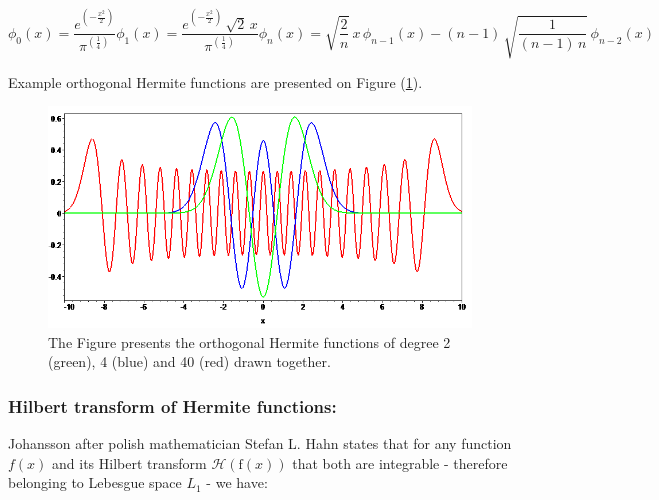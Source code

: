 \documentclass[12pt,twoside,a4paper]{article}
\numberwithin{equation}{subsection}
\numberwithin{figure}{subsection}
\begin{document}
\begin{subequations} \label{eq:hermite_recresult}
  \begin{equation}   \label{eq:hrr_iter}
    \phi_0 (x) = \frac {e^{( - \frac {x ^ 2} {2})}} {\pi ^{(\frac {1}{4})}}
  \end{equation}
  \begin{equation}   \label{eq:hrr_iter_plus1}
    \phi_1 (x) = \frac {e^{( - \frac {x ^ 2} {2})} \, \sqrt{2} \, x} {\pi ^{(\frac {1}{4})}}
  \end{equation}
  \begin{equation}   \label{eq:hrr_weight}
    \phi_n (x) = \sqrt{\frac {2}{n}} \, x \, {\phi_{n - 1}}(x) - (n - 1) \, \sqrt{\frac {1} {(n - 1) \, n}} \, \phi_{n - 2}(x)
  \end{equation}
\end{subequations}

Example orthogonal Hermite functions are presented on Figure (\ref{fig:her_plots}).

\begin{figure}
  \includegraphics[width=150mm]{img/her_plots.png}
  \caption{ The Figure presents the orthogonal Hermite functions of degree 2 (green), 4 (blue) and 40 (red) drawn together. } \label{fig:her_plots}
\end{figure}
 
\subsubsection*{Hilbert transform of Hermite functions:}

Johansson after polish mathematician Stefan L. Hahn \cite{hahn_hilbert} states that for any function $f(x)$ and its Hilbert transform  $\mathcal{H}(\mathrm{f}(x))$ that both are integrable - therefore belonging to Lebesgue space $ L_1 $ - we have:
\end{document}
